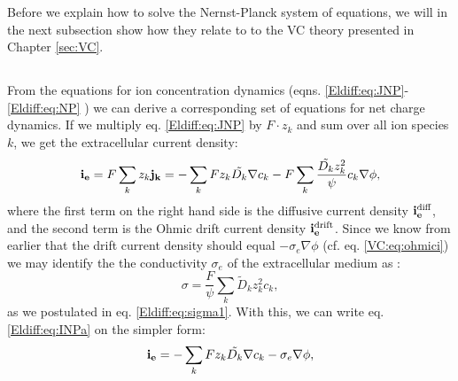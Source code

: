 Before we explain how to solve the Nernst-Planck system of equations, we will in the next subsection show how they relate to to the VC theory presented in Chapter \ref{sec:VC}.


\subsection{}
\label{sec:Eldiff:electrodynamics}
From the equations for ion concentration dynamics (eqns. \ref{Eldiff:eq:JNP}-\ref{Eldiff:eq:NP} ) we can derive a corresponding set of equations for net charge dynamics. If we multiply eq. \ref{Eldiff:eq:JNP} by $F\cdot z_k$ and sum over all ion species $k$, we get the extracellular current density:
\begin{equation}
{\bf i_e} = F\sum_k {z_k {\bf j_k}} = -\sum_k{F z_k \tilde{D_k}{\bf \nabla} c_{k}} - F\sum_{k} \frac{\tilde{D_k} z_{k}^2}{\psi}c_{k} {\bf \nabla}{\phi}, 
\label{Eldiff:eq:INPa}
\end{equation}
where the first term on the right hand side is the diffusive current density ${\bf i_e^\text{diff}}$, and the second term is the Ohmic drift current density ${\bf i_e^\text{drift}}$. Since we know from earlier that the drift current density should equal $- \sigma_e \nabla \phi$  (cf. eq. \ref{VC:eq:ohmici}) we may identify the the conductivity $\sigma_e$ of the extracellular medium as \citep{Koch1999}:
\begin{equation}
\sigma = \frac{F}{\psi}\sum_{k} \tilde{D}_k z_{k}^2 c_{k},
\label{Eldiff:eq:sigma}
\end{equation}
as we postulated in eq. \ref{Eldiff:eq:sigma1}. With this, we can write eq. \ref{Eldiff:eq:INPa} on the simpler form:
\begin{equation}
{\bf i_e} = - \sum_k{F z_k \tilde{D_k}{\bf \nabla} c_{k}} - \sigma_e{\bf \nabla}{\phi},
\label{Eldiff:eq:INP}
\end{equation}

